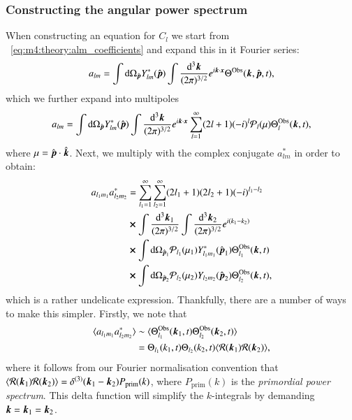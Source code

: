     \subsubsection{Constructing the angular power spectrum}
        When constructing an equation for $C_l$ we start from ~\cref{eq:m4:theory:alm_coefficients} and expand this in it Fourier series:
        \begin{equation}\label{eq:m4:theory:alm_fourier}
            a_{lm} = \int\mathrm{d}\Omega_{\hat{\boldsymbol{p}}}Y_{lm}^*({\hat{\boldsymbol{p}}})\int\frac{\mathrm{d}^3\boldsymbol{k}}{(2\pi)^{3/2}}e^{i\boldsymbol{k}\cdot{\ensuremath{\boldsymbol{x}}}}\Theta^\mathrm{Obs}(\boldsymbol{k}, {\hat{\boldsymbol{p}}},t),
        \end{equation}
        which we further expand into multipoles
        \begin{equation}\label{eq:m4:theory:alm_multipole_expansion}
            a_{lm} = \int\mathrm{d}\Omega_{\hat{\boldsymbol{p}}}Y_{lm}^*({\hat{\boldsymbol{p}}})\int\frac{\mathrm{d}^3\boldsymbol{k}}{(2\pi)^{3/2}}e^{i\boldsymbol{k}\cdot{\ensuremath{\boldsymbol{x}}}} \sum_{l=1}^\infty(2l+1)(-i)^l\mathcal{P}_l(\mu)\Theta^\mathrm{Obs}_l(\boldsymbol{k},t),
        \end{equation}
        where $\mu={\hat{\boldsymbol{p}}}\cdot{\hat{\ensuremath{\boldsymbol{k}}}}$. Next, we multiply with the complex conjugate $a_{lm}^*$ in order to obtain:
        \begin{equation}\label{eq:m4:theory:almalm*}
            \begin{split}
                a_{l_1m_1}a_{l_2m_2}^* &= \sum_{l_1=1}^\infty\sum_{l_2=1}^\infty(2l_1+1)(2l_2+1)(-i)^{l_1-l_2} \\
                &\cross\int\frac{\mathrm{d}^3\boldsymbol{k}_1}{(2\pi)^{3/2}}\int\frac{\mathrm{d}^3\boldsymbol{k}_2}{(2\pi)^{3/2}}e^{i(k_1-k_2)}\\
                &\cross\int\mathrm{d}\Omega_{{\hat{\boldsymbol{p}}}_1}\mathcal{P}_{l_1}(\mu_1)Y_{l_1m_1}^*({\hat{\boldsymbol{p}}}_1)\Theta^\mathrm{Obs}_{l_1}(\boldsymbol{k},t) \\
                &\cross\int\mathrm{d}\Omega_{{\hat{\boldsymbol{p}}}_2}\mathcal{P}_{l_2}(\mu_2)Y_{l_2m_2}({\hat{\boldsymbol{p}}}_2)\Theta^\mathrm{Obs}_{l_2}(\boldsymbol{k},t),
            \end{split}
        \end{equation}
        which is a rather undelicate expression. Thankfully, there are a number of ways to make this simpler. Firstly, we note that 
        \begin{equation}\label{eq:m4:theory:alm_averaging_dependency}
            \begin{split}
                \langle a_{l_1m_1}a_{l_2m_2}^*\rangle &\sim \langle\Theta^\mathrm{Obs}_{l_1}(\boldsymbol{k}_1,t)\Theta^\mathrm{Obs}_{l_2}(\boldsymbol{k}_2,t)\rangle \\
                &= \Theta_{l_1}(k_1,t)\Theta_{l_2}(k_2,t)\langle\mathcal{R}(\boldsymbol{k}_1)\mathcal{R}(\boldsymbol{k}_2)\rangle,
            \end{split}
        \end{equation}
        where it follows from our Fourier normalisation convention that $\langle\mathcal{R}(\boldsymbol{k}_1)\mathcal{R}(\boldsymbol{k}_2)\rangle = \delta^{(3)}(\boldsymbol{k}_1-\boldsymbol{k}_2)P_\mathrm{prim}(k)$, where $P_\mathrm{prim}(k)$ is the \textit{primordial power spectrum}. This delta function will simplify the $k$-integrals by demanding $\boldsymbol{k}=\boldsymbol{k}_1=\boldsymbol{k}_2$. 

